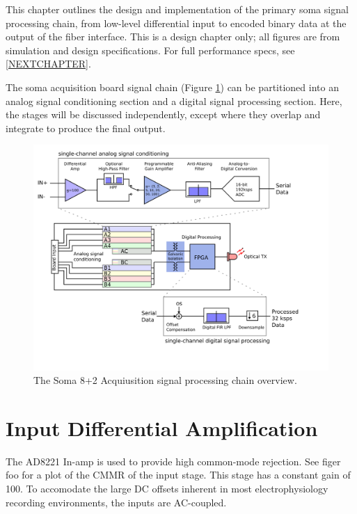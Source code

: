 
This chapter outlines the design and implementation of the primary
soma signal processing chain, from low-level differential input to
encoded binary data at the output of the fiber interface. This is a
design chapter only; all figures are from simulation and design
specifications. For full performance specs, see \ref{NEXTCHAPTER}.

The soma acquisition board signal chain (Figure \ref{signalchain}) can
be partitioned into an analog signal conditioning section and a
digital signal processing section. Here, the stages will be discussed
independently, except where they overlap and integrate to produce the
final output.

\begin{figure}
  \begin{center}
    \includegraphics[scale=1.0]{signalchain.svg}
    \caption{The Soma 8+2 Acquiusition signal processing chain
      overview.}
    \label{signalchain}
  \end{center}
\end{figure}

\section{Input Differential Amplification}

The AD8221 In-amp is used to provide high common-mode rejection. See
figer foo for a plot of the CMMR of the input stage. This stage has a
constant gain of 100.  To accomodate the large DC offsets inherent in
most electrophysiology recording environments, the inputs are
AC-coupled.


